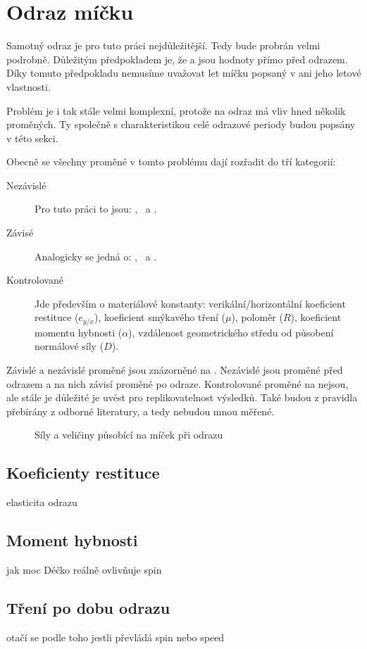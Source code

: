 \section{Odraz míčku}
\label{sec:odraz-micku}

Samotný odraz je pro tuto práci nejdůležitější. Tedy bude probrán velmi
podrobně. Důležitým předpokladem je, že  a  jsou hodnoty přímo
před odrazem. Díky tomuto předpokladu nemusíme uvažovat let míčku
popsaný v  ani jeho letové vlastnosti.

Problém je i tak stále velmi komplexní, protože na odraz má vliv hned několik
proměných. Ty společně s charakteristikou celé odrazové periody budou popsány v
této sekci.

Obecně se všechny proměné v tomto problému dají rozřadit do tří kategorií:

\begin{description}
 \item[Nezávislé] Pro tuto práci to jsou: ,~ a .
 \item[Závisé] Analogicky se jedná o: ,~ a .
 \item[Kontrolované] Jde především o materiálové konstanty:
  verikální/horizontální koeficient restituce ($e_{y/x}$), koeficient smýkavého
 tření ($\mu$), poloměr ($R$), koeficient momentu hybnosti ($\alpha$),
 vzdálenost geometrického středu od působení normálové síly ($D$).
\end{description}

Závislé a nezávislé proměné jsou znázorněné na .
Nezávislé jsou proměné před odrazem a na nich závisí proměné po odraze.
Kontrolované proměné na  nejsou, ale stále je
důležité je uvést pro replikovatelnost výsledků. Také budou z pravidla přebírány
z odborné literatury, a tedy nebudou mnou měřené. 

\begin{figure}[htbp]
 \centering
 

 \caption{Síly a veličiny působící na míček při odrazu}
 \label{fig:odraz-micku}
\end{figure}

\subsection{Koeficienty restituce}
\label{ssec:koeficienty-restituce}
elasticita odrazu 

\subsection{Moment hybnosti}
\label{ssec:moment-hybnosti}
jak moc Déčko reálně ovlivňuje spin

\subsection{Tření po dobu odrazu}
\label{ssec:treni-po-dobu-odrazu}
otačí se podle toho jestli převládá spin nebo speed


